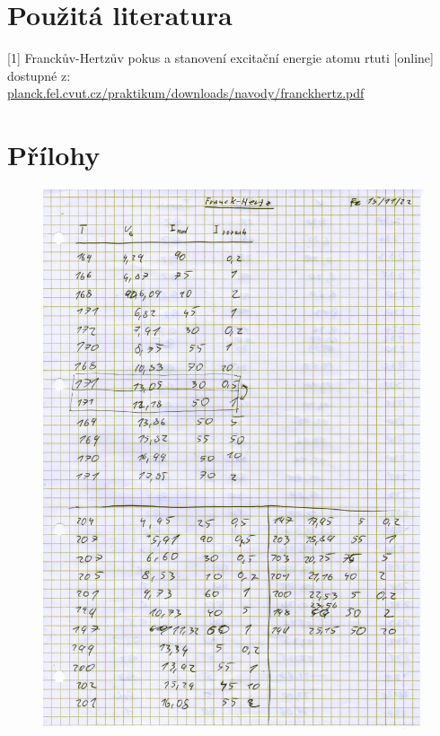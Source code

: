 \documentclass[titlepage]{article}
\begin{document}
\section{Použitá literatura}
[1] Franckův-Hertzův pokus a stanovení excitační energie atomu rtuti [online] dostupné z: \\\url{planck.fel.cvut.cz/praktikum/downloads/navody/franckhertz.pdf}

\section{Přílohy}
\begin{figure}[H]
 \centering
 \begin{minipage}{0.4\textwidth}
  \includegraphics[width=\textwidth]{scan/page1.png}
 \end{minipage}
 \hfil
 \begin{minipage}{0.4\textwidth}

\end{minipage}
\end{figure}
\end{document}
